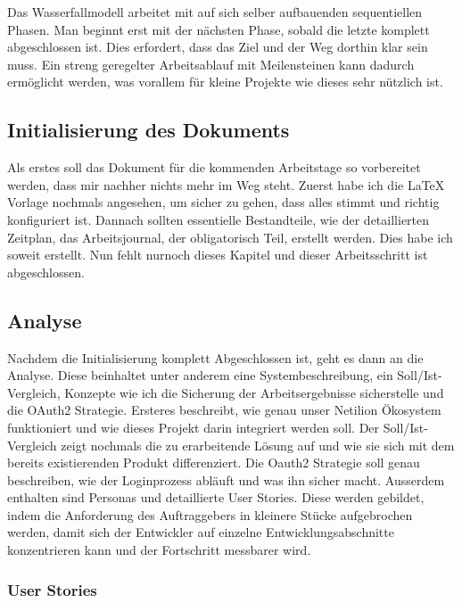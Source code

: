 Das Wasserfallmodell arbeitet mit auf sich selber aufbauenden sequentiellen Phasen. Man beginnt erst mit der nächsten Phase, sobald die letzte komplett abgeschlossen ist. Dies erfordert, dass das Ziel und der Weg dorthin klar sein muss. Ein streng geregelter Arbeitsablauf mit Meilensteinen kann dadurch ermöglicht werden, was vorallem für kleine Projekte wie dieses sehr nützlich ist.

\subsection{Initialisierung des Dokuments}

Als erstes soll das Dokument für die kommenden Arbeitstage so vorbereitet werden, dass mir nachher nichts mehr im Weg steht. Zuerst habe ich die LaTeX Vorlage nochmals angesehen, um sicher zu gehen, dass alles stimmt und richtig konfiguriert ist. Dannach sollten essentielle Bestandteile, wie der detaillierten Zeitplan, das Arbeitsjournal, der obligatorisch Teil, erstellt werden. Dies habe ich soweit erstellt. Nun fehlt nurnoch dieses Kapitel und dieser Arbeitsschritt ist abgeschlossen.

\subsection{Analyse}

Nachdem die Initialisierung komplett Abgeschlossen ist, geht es dann an die Analyse. Diese beinhaltet unter anderem eine Systembeschreibung, ein Soll/Ist-Vergleich, Konzepte wie ich die Sicherung der Arbeitsergebnisse sicherstelle und die OAuth2 Strategie. Ersteres beschreibt, wie genau unser Netilion Ökosystem funktioniert und wie dieses Projekt darin integriert werden soll. Der Soll/Ist-Vergleich zeigt nochmals die zu erarbeitende Lösung auf und wie sie sich mit dem bereits existierenden Produkt differenziert. Die Oauth2 Strategie soll genau beschreiben, wie der Loginprozess abläuft und was ihn sicher macht.
\newline
Ausserdem enthalten sind Personas und detaillierte User Stories. Diese werden gebildet, indem die Anforderung des Auftraggebers in kleinere Stücke aufgebrochen werden, damit sich der Entwickler auf einzelne Entwicklungsabschnitte konzentrieren kann und der Fortschritt messbarer wird.

\subsubsection{User Stories}

